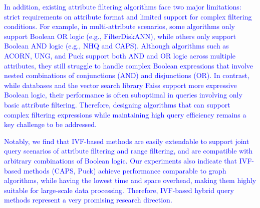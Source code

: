 \documentclass[sigconf, nonacm]{acmart}
\begin{document}
{	\textcolor{blue}{In addition, existing attribute filtering algorithms face two major limitations: strict requirements on attribute format and limited support for complex filtering conditions. }
		\textcolor{blue}{
For example, in multi-attribute scenarios, some algorithms only support Boolean OR logic (e.g., FilterDiskANN), while others only support Boolean AND logic (e.g., NHQ and CAPS). Although algorithms such as ACORN, UNG, and Puck support both AND and OR logic across multiple attributes, they still struggle to handle complex Boolean expressions that involve nested combinations of conjunctions (AND) and disjunctions (OR). In contrast, while databases and the vector search library Faiss support more expressive Boolean logic, their performance is often suboptimal in queries involving only basic attribute filtering.
Therefore, designing algorithms that can support complex filtering expressions while maintaining high query efficiency remains a key challenge to be addressed. }

\textcolor{blue}{Notably, we find that IVF-based methods are easily extendable to support joint query scenarios of attribute filtering and range filtering, and are compatible with arbitrary combinations of Boolean logic. Our experiments also indicate that IVF-based methods (CAPS, Puck) achieve performance comparable to graph algorithms, while having the lowest time and space overhead, making them highly suitable for large-scale data processing. Therefore, IVF-based hybrid query methods represent a very promising research direction.}
		
}
\end{document}
